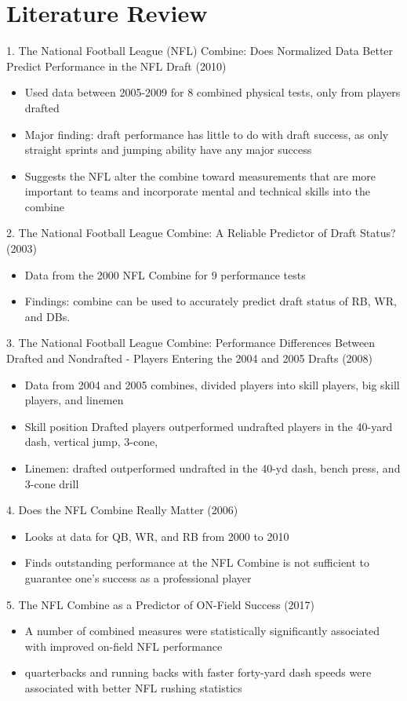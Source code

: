 \documentclass[12pt,english]{article}
\begin{document}
\section{Literature Review}\label{sec:litreview}
1. The National Football League (NFL) Combine: Does Normalized Data Better Predict Performance in the NFL Draft (2010)
    \begin{itemize}
    \item Used data between 2005-2009 for 8 combined physical tests, only from players drafted
    \item Major finding: draft performance has little to do with draft success, as only straight sprints and jumping ability have any major success
    \item Suggests the NFL alter the combine toward measurements that are more important to teams and incorporate mental and technical skills into the combine
    \end{itemize}
2. The National Football League Combine: A Reliable Predictor of Draft Status? (2003)
    \begin{itemize}
    \item Data from the 2000 NFL Combine for 9 performance tests
    \item Findings: combine can be used to accurately predict draft status of RB, WR, and DBs.
    \end{itemize}
3. The National Football League Combine: Performance Differences Between Drafted and Nondrafted - Players Entering the 2004 and 2005 Drafts (2008)
    \begin{itemize}
    \item Data from 2004 and 2005 combines, divided players into skill players, big skill players, and linemen
    \item Skill position Drafted players outperformed undrafted players in the 40-yard dash, vertical jump, 3-cone,
    \item Linemen: drafted outperformed undrafted in the 40-yd dash, bench press, and 3-cone drill
    \end{itemize}
4. Does the NFL Combine Really Matter (2006)
    \begin{itemize}
    \item Looks at data for QB, WR, and RB from 2000 to 2010
    \item Finds outstanding performance at the NFL Combine is not sufficient to guarantee one’s success as a professional player
    \end{itemize}
5. The NFL Combine as a Predictor of ON-Field Success (2017)
    \begin{itemize}
    \item A number of combined measures were statistically significantly associated with improved on-field NFL performance
    \item quarterbacks and running backs with faster forty-yard dash speeds were associated with better NFL rushing statistics
    \end{itemize}
\end{document}
